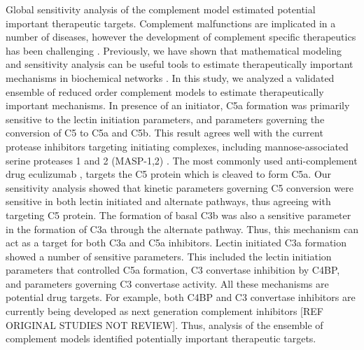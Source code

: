 \documentclass[12pt]{article}
\begin{document}
Global sensitivity analysis of the complement model estimated potential important therapeutic targets.
Complement malfunctions are implicated in a number of diseases, however the
development of complement specific therapeutics has been challenging \cite{ricklin2007complement}.
Previously, we have shown that mathematical modeling and sensitivity analysis can be useful tools to estimate therapeutically important mechanisms in biochemical networks \cite{Luan:2007aa,Nayak:2008aa,Tasseff:2010aa,Rice:2016aa}.
In this study, we analyzed a validated ensemble of reduced order complement models to estimate therapeutically important mechanisms.
In presence of an initiator, C5a formation was primarily sensitive to the lectin initiation parameters,
and parameters governing the conversion of C5 to C5a and C5b.
This result agrees well with the current protease inhibitors targeting initiating complexes, including mannose-associated serine proteases 1 and  2 (MASP-1,2) \cite{morgan2015complement}.
The most commonly used anti-complement drug eculizumab \cite{morgan2015complement}, targets the C5 protein which is cleaved to form C5a.
Our sensitivity analysis showed that kinetic parameters governing C5 conversion were sensitive in both lectin initiated and alternate pathways, thus agreeing with targeting C5 protein.
The formation of basal C3b was also a sensitive parameter in the formation of C3a through the alternate pathway.
Thus, this mechanism can act as a target for both C3a and C5a inhibitors.
Lectin initiated C3a formation showed a number of sensitive parameters.
This included the lectin initiation parameters that controlled C5a formation, C3 convertase inhibition by C4BP, and parameters governing C3 convertase activity.
All these mechanisms are potential drug targets.
For example, both C4BP and C3 convertase inhibitors are currently being developed as next generation complement inhibitors [REF ORIGINAL STUDIES NOT REVIEW].
Thus, analysis of the ensemble of complement models identified potentially important therapeutic targets.



\end{document}

